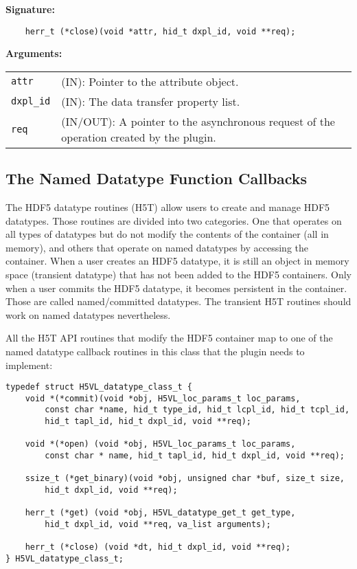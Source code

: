 \textbf{Signature:}
\begin{lstlisting}
    herr_t (*close)(void *attr, hid_t dxpl_id, void **req);
\end{lstlisting}

\textbf{Arguments:}\\
\begin{tabular}{l p{10cm}}
  {\tt attr} & (IN): Pointer to the attribute object.\\
  {\tt dxpl\_id} & (IN): The data transfer property list.\\
  {\tt req} & (IN/OUT): A pointer to the asynchronous request of the
  operation created by the plugin.\\
\end{tabular}

\subsection{The Named Datatype Function Callbacks}
The HDF5 datatype routines (H5T) allow users to create and manage HDF5
datatypes. Those routines are divided into two categories. One that
operates on all types of datatypes but do not modify the contents of
the container (all in memory), and others that operate on named
datatypes by accessing the container. When a user creates an HDF5
datatype, it is still an object in memory space (transient datatype)
that has not been added to the HDF5 containers. Only when a user
commits the HDF5 datatype, it becomes persistent in the
container. Those are called named/committed datatypes. The transient
H5T routines should work on named datatypes nevertheless. 

All the H5T API routines that modify the HDF5 container map to one of
the named datatype callback routines in this class that the plugin needs to
implement:

\begin{lstlisting}
typedef struct H5VL_datatype_class_t {
    void *(*commit)(void *obj, H5VL_loc_params_t loc_params, 
        const char *name, hid_t type_id, hid_t lcpl_id, hid_t tcpl_id, 
        hid_t tapl_id, hid_t dxpl_id, void **req);

    void *(*open) (void *obj, H5VL_loc_params_t loc_params, 
        const char * name, hid_t tapl_id, hid_t dxpl_id, void **req);

    ssize_t (*get_binary)(void *obj, unsigned char *buf, size_t size, 
        hid_t dxpl_id, void **req);

    herr_t (*get) (void *obj, H5VL_datatype_get_t get_type, 
        hid_t dxpl_id, void **req, va_list arguments);

    herr_t (*close) (void *dt, hid_t dxpl_id, void **req);
} H5VL_datatype_class_t;
\end{lstlisting}

